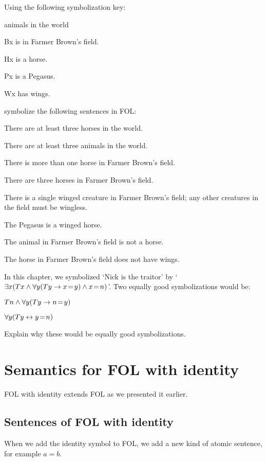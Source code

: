 \problempart Using the following symbolization key:
\begin{ekey}
\item[\text{domain}] animals in the world
\item[Bx]  is in Farmer Brown's field.
\item[Hx]  is a horse.
\item[Px]  is a Pegasus.
\item[Wx]  has wings.
\end{ekey}
symbolize the following sentences in FOL:
\begin{earg}
\item There are at least three horses in the world.
\item There are at least three animals in the world.
\item There is more than one horse in Farmer Brown's field.
\item There are three horses in Farmer Brown's field.
\item There is a single winged creature in Farmer Brown's field; any other creatures in the field must be wingless.
\item The Pegasus is a winged horse.
\item The animal in Farmer Brown's field is not a horse.
\item The horse in Farmer Brown's field does not have wings.
\end{earg}

\problempart
In this chapter, we symbolized `Nick is the traitor' by `$\exists x (Tx \wedge \forall y(Ty \rightarrow x \!=\! y) \wedge x \!=\! n)$'. Two equally good symbolizations would be:
	\begin{ebullet}
		\item $Tn \wedge \forall y(Ty \rightarrow n \!=\! y)$
		\item $\forall y(Ty \leftrightarrow y \!=\! n)$
	\end{ebullet}
Explain why these would be equally good symbolizations.

\chapter{Semantics for FOL with identity}
FOL with identity extends FOL as we presented it earlier. 
\section{Sentences of FOL with identity}When we add the identity symbol to FOL, we add a new kind of atomic sentence, for example $a=b$. 

